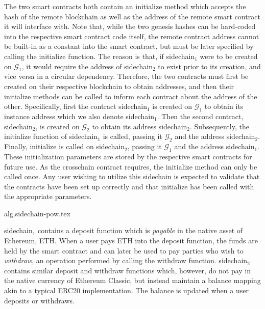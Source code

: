 The two smart contracts both contain an \textsf{initialize} method which accepts
the hash of the remote blockchain as well as the address of the remote smart
contract it will interface with. Note that, while the two genesis hashes can be
hard-coded into the respective smart contract code itself, the remote contract
address cannot be built-in as a constant into the smart contract, but must be
later specified by calling the \textsf{initialize} function. The reason is that,
if \textsf{sidechain}$_1$ were to be created on $\mathcal{G}_1$, it would
require the address of \textsf{sidechain}$_2$ to exist prior to its creation,
and vice versa in a circular dependency. Therefore, the two contracts must first
be created on their respective blockchain to obtain addresses, and then their
\textsf{initialize} methods can be called to inform each contract about the
address of the other. Specifically, first the contract \textsf{sidechain}$_1$ is
created on $\mathcal{G}_1$ to obtain its instance address which we also
denote \textsf{sidechain}$_1$. Then the second contract, \textsf{sidechain}$_2$,
is created on $\mathcal{G}_2$ to obtain its address \textsf{sidechain}$_2$.
Subsequently, the \textsf{initialize} function of \textsf{sidechain}$_1$ is
called, passing it $\mathcal{G}_2$ and the address \textsf{sidechain}$_2$.
Finally, \textsf{initialize} is called on \textsf{sidechain}$_2$, passing it
$\mathcal{G}_1$ and the address \textsf{sidechain}$_1$. These initialization
parameters are stored by the respective smart contracts for future use. As the
\textsf{crosschain} contract requires, the \textsf{initialize} method can only
be called once. Any user wishing to utilize this sidechain is expected to
validate that the contracts have been set up correctly and that
\textsf{initialize} has been called with the appropriate parameters.

{alg.sidechain-pow.tex}

\textsf{sidechain}$_1$ contains a \textsf{deposit} function
which is \emph{payable} in the native asset of Ethereum, ETH. When a user pays
ETH into the \textsf{deposit} function, the funds are held by the smart contract
and can later be used to pay parties who wish to \emph{withdraw}, an operation
performed by calling the \textsf{withdraw} function. \textsf{sidechain}$_2$
contains similar \textsf{deposit} and \textsf{withdraw} functions which,
however, do not pay in the native currency of Ethereum Classic, but instead
maintain a \textsf{balance} mapping akin to a typical ERC20 implementation. The
balance is updated when a user deposits or withdraws.

